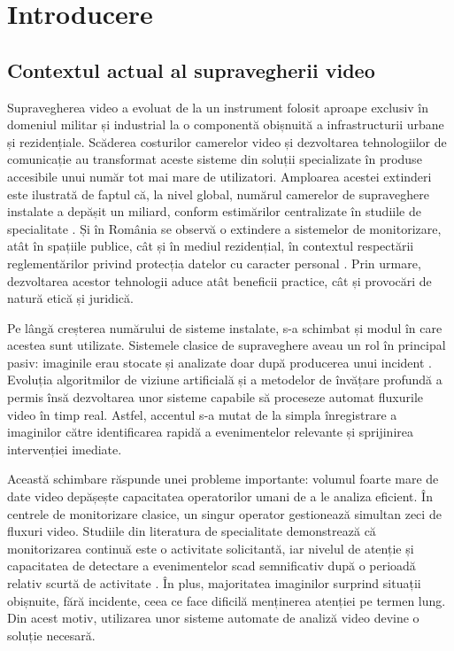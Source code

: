 \documentclass[../../main.tex]{subfiles}
\begin{document}
\chapter{Introducere}
\label{ch:introducere}

\section{Contextul actual al supravegherii video}
\label{sec:context}

Supravegherea video a evoluat de la un instrument folosit aproape exclusiv în domeniul militar și industrial la o componentă obișnuită a infrastructurii urbane și rezidențiale. Scăderea costurilor camerelor video și dezvoltarea tehnologiilor de comunicație au transformat aceste sisteme din soluții specializate în produse accesibile unui număr tot mai mare de utilizatori. Amploarea acestei extinderi este ilustrată de faptul că, la nivel global, numărul camerelor de supraveghere instalate a depășit un miliard, conform estimărilor centralizate în studiile de specialitate \cite{comparitech_2025}. Și în România se observă o extindere a sistemelor de monitorizare, atât în spațiile publice, cât și în mediul rezidențial, în contextul respectării reglementărilor privind protecția datelor cu caracter personal \cite{legea190}. Prin urmare, dezvoltarea acestor tehnologii aduce atât beneficii practice, cât și provocări de natură etică și juridică.

Pe lângă creșterea numărului de sisteme instalate, s-a schimbat și modul în care acestea sunt utilizate. Sistemele clasice de supraveghere aveau un rol în principal pasiv: imaginile erau stocate și analizate doar după producerea unui incident \cite{sreenu_durai}. Evoluția algoritmilor de viziune artificială și a metodelor de învățare profundă a permis însă dezvoltarea unor sisteme capabile să proceseze automat fluxurile video în timp real. Astfel, accentul s-a mutat de la simpla înregistrare a imaginilor către identificarea rapidă a evenimentelor relevante și sprijinirea intervenției imediate.

Această schimbare răspunde unei probleme importante: volumul foarte mare de date video depășește capacitatea operatorilor umani de a le analiza eficient. În centrele de monitorizare clasice, un singur operator gestionează simultan zeci de fluxuri video. Studiile din literatura de specialitate demonstrează că monitorizarea continuă este o activitate solicitantă, iar nivelul de atenție și capacitatea de detectare a evenimentelor scad semnificativ după o perioadă relativ scurtă de activitate \cite{sulman_2008, nasholm_2014}. În plus, majoritatea imaginilor surprind situații obișnuite, fără incidente, ceea ce face dificilă menținerea atenției pe termen lung. Din acest motiv, utilizarea unor sisteme automate de analiză video devine o soluție necesară.
\end{document}
